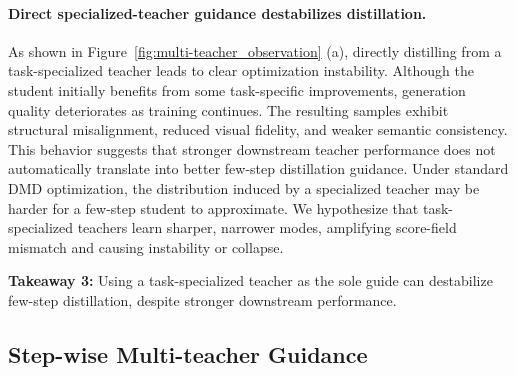 \documentclass{article}
\begin{document}
\paragraph{Direct specialized-teacher guidance destabilizes distillation.}
As shown in Figure~\ref{fig:multi-teacher_observation} (a), directly distilling from a task-specialized teacher leads to clear optimization instability. Although the student initially benefits from some task-specific improvements, generation quality deteriorates as training continues. The resulting samples exhibit structural misalignment, reduced visual fidelity, and weaker semantic consistency. This behavior suggests that stronger downstream teacher performance does not automatically translate into better few-step distillation guidance. Under standard DMD optimization, the distribution induced by a specialized teacher may be harder for a few-step student to approximate. We hypothesize that task-specialized teachers learn sharper, narrower modes, amplifying score-field mismatch and causing instability or collapse.


\begin{tcolorbox}[
colback=blue!3,
colframe=blue!70!black,
boxrule=0.8pt,
arc=6pt,
left=6pt,
right=6pt,
top=4pt,
bottom=4pt
]
\textbf{Takeaway 3:} Using a task-specialized teacher as the sole guide can destabilize few-step distillation, despite stronger downstream performance.
\end{tcolorbox}


\subsection{Step-wise Multi-teacher Guidance}
\end{document}
